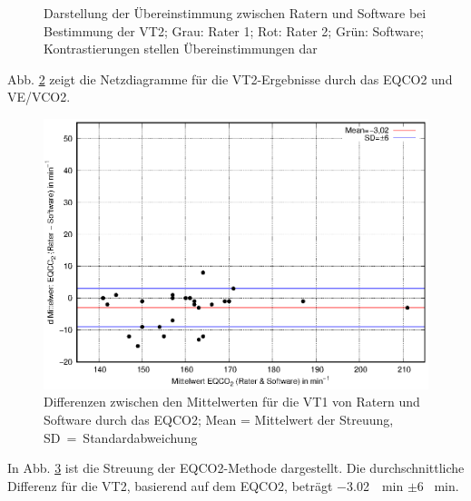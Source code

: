 \begin{figure}[H]
\begin{subfigure}[c]{0.45\textwidth}
		\label{subpic:pic4}
	\end{subfigure}
	\caption[Grafische Darstellung der Übereinstimmung für die VT2]{Darstellung der Übereinstimmung zwischen Ratern und Software bei Bestimmung der VT2; Grau: Rater 1; Rot: Rater 2; Grün: Software; Kontrastierungen stellen Übereinstimmungen dar}
	\label{pic:pic25}
\end{figure}
%
Abb. \ref{pic:pic25} zeigt die Netzdiagramme für die VT2-Ergebnisse durch das \gls{EQCO2} und \gls{VE}/\gls{VCO2}.

\begin{figure}[H]
	\centering
	\includegraphics[scale=0.95]{Bilder/eqco2.eps}
	\caption[Differenzen der \gls{EQCO2}-Ergebnisse zwischen Ratern und Software]{Differenzen zwischen den Mittelwerten für die VT1 von Ratern und Software durch das \gls{EQCO2}; Mean = Mittelwert der Streuung, SD~=~Standardabweichung}
	\label{pic:pic26}
\end{figure}
%
In Abb. \ref{pic:pic26} ist die Streuung der \gls{EQCO2}-Methode dargestellt. Die durchschnittliche Differenz für die VT2, basierend auf dem \gls{EQCO2}, beträgt \SI{-3,02}{\per\minute} $\pm$6 \si{\per\minute}.
%
